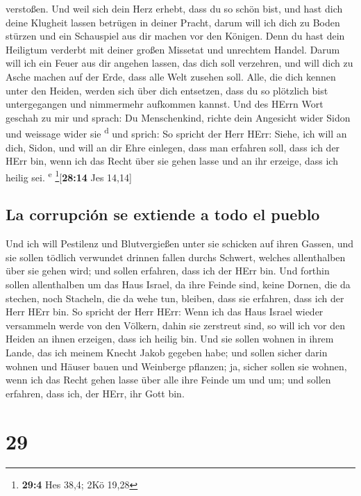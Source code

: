 verstoßen.  Und weil sich dein Herz erhebt, dass du so
schön bist, und hast dich deine Klugheit lassen betrügen in deiner
Pracht, darum will ich dich zu Boden stürzen und ein Schauspiel aus dir
machen vor den Königen.  Denn du hast dein Heiligtum
verderbt mit deiner großen Missetat und unrechtem Handel. Darum will ich
ein Feuer aus dir angehen lassen, das dich soll verzehren, und will dich
zu Asche machen auf der Erde, dass alle Welt zusehen soll.
 Alle, die dich kennen unter den Heiden, werden sich über
dich entsetzen, dass du so plötzlich bist untergegangen und nimmermehr
aufkommen kannst.  Und des HErrn Wort geschah zu mir und
sprach:  Du Menschenkind, richte dein Angesicht wider
Sidon und weissage wider sie \textsuperscript{d}  und
sprich: So spricht der Herr HErr: Siehe, ich will an dich, Sidon, und
will an dir Ehre einlegen, dass man erfahren soll, dass ich der HErr
bin, wenn ich das Recht über sie gehen lasse und an ihr erzeige, dass
ich heilig sei. \textsuperscript{e} \footnote{\textbf{29:4} Hes 38,4;
  2Kö 19,28}{[}\textbf{28:14} Jes 14,14{]}

\hypertarget{la-corrupciuxf3n-se-extiende-a-todo-el-pueblo}{%
\subsection{La corrupción se extiende a todo el
pueblo}\label{la-corrupciuxf3n-se-extiende-a-todo-el-pueblo}}

 Und ich will Pestilenz und Blutvergießen unter sie
schicken auf ihren Gassen, und sie sollen tödlich verwundet drinnen
fallen durchs Schwert, welches allenthalben über sie gehen wird; und
sollen erfahren, dass ich der HErr bin.  Und forthin
sollen allenthalben um das Haus Israel, da ihre Feinde sind, keine
Dornen, die da stechen, noch Stacheln, die da wehe tun, bleiben, dass
sie erfahren, dass ich der Herr HErr bin.  So spricht der
Herr HErr: Wenn ich das Haus Israel wieder versammeln werde von den
Völkern, dahin sie zerstreut sind, so will ich vor den Heiden an ihnen
erzeigen, dass ich heilig bin. Und sie sollen wohnen in ihrem Lande, das
ich meinem Knecht Jakob gegeben habe;  und sollen sicher
darin wohnen und Häuser bauen und Weinberge pflanzen; ja, sicher sollen
sie wohnen, wenn ich das Recht gehen lasse über alle ihre Feinde um und
um; und sollen erfahren, dass ich, der HErr, ihr Gott bin.

\hypertarget{section-28}{%
\section{29}\label{section-28}}

